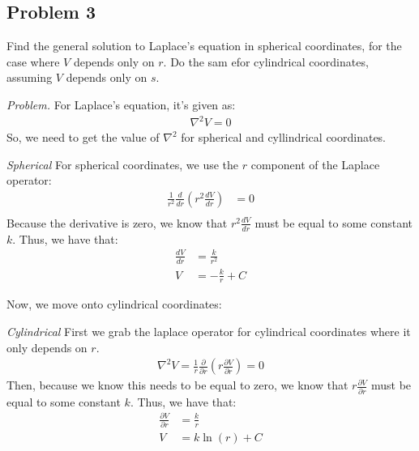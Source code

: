 \documentclass[10pt,oneside]{book}
\newcommand{\gspc}{\vspace{0.13cm}} %
\newcommand{\prt}[2]{\frac{\partial#1}{\partial#2}}
\newenvironment{problem}[1]
  {\vspace{-0.1cm}\begin{tcolorbox}[problembox]
   \textit{Problem. }#1}
  {\end{tcolorbox}\gspc}
\newenvironment{subproblem}[2]
  {\vspace{-0.1cm}\begin{tcolorbox}[subproblembox]
   \textit{#1 }#2}
  {\end{tcolorbox}\gspc}
\newcommand{\cpr}[1]{\left(#1\right)}
\begin{document}
\subsection*{Problem 3}
Find the general solution to Laplace's equation in spherical coordinates, for the case where $V$ depends only on $r$. Do the sam efor cylindrical coordinates, assuming $V$ depends only on $s$. 
\begin{problem}
  For Laplace's equation, it's given as:
  \begin{align*}
    \nabla^2 V = 0
  \end{align*}
  So, we need to get the value of $\nabla^2$ for spherical and cyllindrical coordinates.
  \begin{subproblem}{Spherical}
    For spherical coordinates, we use the $r$ component of the Laplace operator:
    \begin{align*}
      \frac{1}{r^2}\frac{d}{dr}\cpr{r^2\frac{dV}{dr}}&=0\\
    \end{align*}
    Because the derivative is zero, we know that $r^2\frac{dV}{dr}$ must be equal to some constant $k$. Thus, we have that:
    \begin{align*}
      \frac{dV}{dr}&= \frac{k}{r^2}\\
      V &= -\frac{k}r + C
    \end{align*}
  \end{subproblem}
  Now, we move onto cylindrical coordinates:
  \begin{subproblem}{Cylindrical}
    First we grab the laplace operator for cylindrical coordinates where it only depends on $r$. 
    \begin{align*}
      \nabla^2V = \frac{1}r\prt{}r\cpr{r\prt{V}r}=0
    \end{align*}
    Then, because we know this needs to be equal to zero, we know that $r\prt{V}r$ must be equal to some constant $k$. Thus, we have that:
    \begin{align*}
      \prt{V}r &= \frac{k}r\\
      V &= k\ln(r) + C
    \end{align*}
    
  \end{subproblem}
\end{problem}
\end{document}
